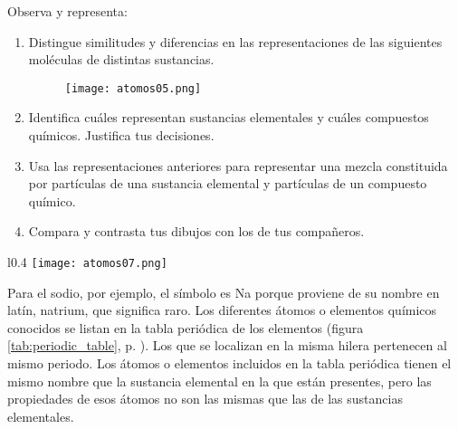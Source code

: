 \begin{minipage}{\textwidth}
    \begin{boxK}
        Observa y representa:

        \begin{enumerate}
            \item Distingue similitudes y diferencias en las representaciones de las siguientes
                  moléculas de distintas sustancias.

                  \begin{figure}[H]
                      \centering
                      \texttt{[image: atomos05.png]}
                  \end{figure}

            \item Identifica cuáles representan sustancias elementales y cuáles compuestos químicos. Justifica tus decisiones.
            \item Usa las representaciones anteriores para representar una mezcla constituida por
                  partículas de una sustancia elemental y partículas de un compuesto químico.
            \item Compara y contrasta tus dibujos con los de tus compañeros.
        \end{enumerate}
    \end{boxK}
\end{minipage}
\vspace{0.5cm}

\begin{wrapfigure}{l}{0.4\textwidth}
    \centering
    \texttt{[image: atomos07.png]}
    \label{fig:atomos07}
\end{wrapfigure}

Para el sodio, por ejemplo, el símbolo es Na porque proviene de su nombre en latín, natrium, que significa raro.
Los diferentes átomos o elementos químicos conocidos se listan en la
tabla periódica de los elementos (figura \ref{tab:periodic_table}, p. \pageref{tab:periodic_table}). Los que se localizan en la misma hilera pertenecen
al mismo periodo. Los átomos o elementos incluidos en la tabla periódica tienen el mismo
nombre que la sustancia elemental en la que están presentes, pero las propiedades de esos átomos no son
las mismas que las de las sustancias elementales.\\

